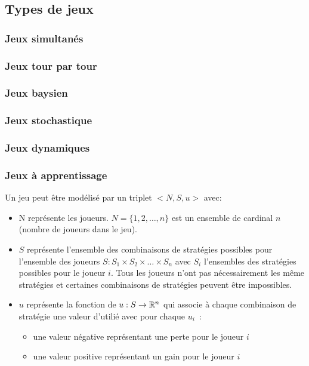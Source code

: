 \subsection{Types de jeux}
\subsubsection{Jeux simultan\'es}

\subsubsection{Jeux tour par tour}

\subsubsection{Jeux baysien}

\subsubsection{Jeux stochastique}

\subsubsection{Jeux dynamiques}

\subsubsection{Jeux \`a apprentissage}


\begin{defn}
Un jeu peut \^etre mod\'elis\'e par un triplet $<N, S, u>$ avec:
\begin{itemize}
\item N repr\'esente les joueurs. $N = \{1,2,\ldots,n\}$ est un ensemble de cardinal $n$ (nombre de joueurs dans le jeu). 
\item $S$ repr\'esente l'ensemble des combinaisons de strat\'egies possibles pour l'ensemble des joueurs $S: S_1 \times S_2 \times \ldots \times S_n$ avec $S_i$ l'ensembles des strat\'egies possibles pour le joueur $i$. Tous les joueurs n'ont pas n\'ecessairement les m\^eme strat\'egies et certaines combinaisons de strat\'egies peuvent \^etre impossibles. 
\item $u$ repr\'esente la fonction de $u: S \to \mathbb{R}^n$ qui associe \`a chaque combinaison de strat\'egie une valeur d'utili\'e avec pour chaque $u_i$\ :
  \begin{itemize}
  \item une valeur n\'egative repr\'esentant une perte pour le joueur $i$
  \item une valeur positive repr\'esentant un gain pour le joueur $i$
  \end{itemize} 
\end{itemize}
\end{defn}

